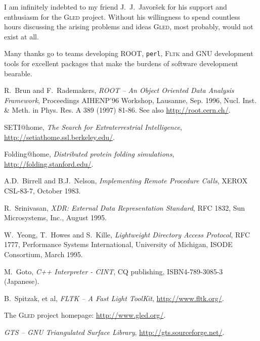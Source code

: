 \documentclass[final]{siamltex}
\def\gled{\textsc{Gled}\xspace}
\def\smalltt#1{{\small\texttt{#1}}}
\begin{document}
I am infinitely indebted to my friend J.~J.~Javor\v{s}ek for his
support and enthusiasm for the \gled project. Without his
willingness to spend countless hours discussing the arising problems
and ideas \gled, most probably, would not exist at all.

Many thanks go to teams developing ROOT, \smalltt{perl}, \textsc{Fltk}
and GNU development tools for excellent packages that make the burdens
of software development bearable.


\begin{thebibliography}{99}
  
 R.~Brun and F.~Rademakers, \emph{ROOT -- An Object
    Oriented Data Analysis Framework}, Proceedings AIHENP'96 Workshop,
  Lausanne, Sep. 1996, Nucl. Inst. \& Meth. in Phys. Res. A 389 (1997)
  81-86. See also \url{http://root.cern.ch/}.
  
 SETI@home, \emph{The Search for Extraterrestrial
    Intelligence}, \url{http://setiathome.ssl.berkeley.edu/}.
  
 Folding@home, \emph{Distributed protein folding
    simulations}, \url{http://folding.stanford.edu/}.

 A.D.~Birrell and B.J.~Nelson, \emph{Implementing Remote
    Procedure Calls}, XEROX CSL-83-7, October 1983.
      
 R.~Srinivasan, \emph{XDR: External Data Representation
    Standard}, RFC 1832, Sun Microsystems, Inc., August 1995.
        
 W.~Yeong, T.~Howes and S.~Kille, \emph{Lightweight
    Directory Access Protocol}, RFC 1777, Performance Systems
  International, University of Michigan, ISODE Consortium, March 1995.
  
 M.~Goto, \emph{C++ Interpreter - CINT}, CQ publishing,
  ISBN4-789-3085-3 (Japanese).

 B.~Spitzak, et al, \emph{FLTK -- A Fast Light ToolKit},
  \url{http://www.fltk.org/}.
  
 The \gled project homepage: \url{http://www.gled.org/}.
  
 \emph{GTS -- GNU Triangulated Surface Library},
  \url{http://gts.sourceforge.net/}.

\end{thebibliography}
\end{document}
